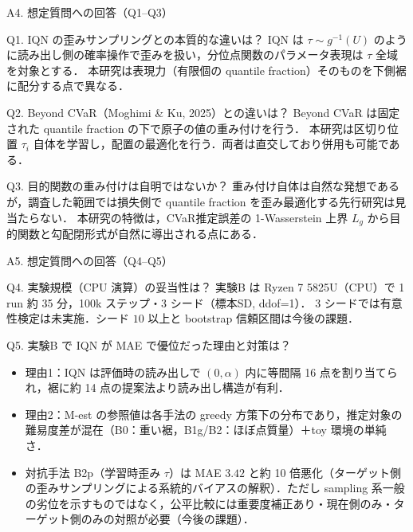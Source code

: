 \documentclass[aspectratio=169, 10pt]{beamer}
\newcommand{\Lg}{L_g}
\begin{document}
\begin{frame}{A4. 想定質問への回答（Q1--Q3）}
  \begin{alertblock}{Q1. IQN の歪みサンプリングとの本質的な違いは？}
    IQN は $\tau\sim g^{-1}(U)$ のように\alert{読み出し側の確率操作}で歪みを扱い，分位点関数のパラメータ表現は $\tau$ 全域を対象とする．
    本研究は\alert{表現力（有限個の quantile fraction）そのものを下側裾に配分}する点で異なる．
  \end{alertblock}
  \begin{alertblock}{Q2. Beyond CVaR（Moghimi \& Ku, 2025）との違いは？}
    Beyond CVaR は\alert{固定}された quantile fraction の下で原子の\alert{値の重み付け}を行う．
    本研究は\alert{区切り位置 $\tau_i$ 自体を学習}し，配置の最適化を行う．両者は直交しており併用も可能である．
  \end{alertblock}
  \begin{alertblock}{Q3. 目的関数の重み付けは自明ではないか？}
    重み付け自体は自然な発想であるが，調査した範囲では\alert{損失側で quantile fraction を歪み最適化する先行研究は見当たらない}．
    本研究の特徴は，CVaR推定誤差の 1-Wasserstein 上界 $\Lg$ から目的関数と勾配閉形式が\alert{自然に導出される}点にある．
  \end{alertblock}
\end{frame}

\begin{frame}{A5. 想定質問への回答（Q4--Q5）}
  \begin{alertblock}{Q4. 実験規模（CPU 演算）の妥当性は？}
    実験B は Ryzen 7 5825U（CPU）で 1 run 約 35 分，100k ステップ・3 シード（標本SD, ddof=1）．
    3 シードでは有意性検定は\alert{未実施}．シード $10$ 以上と bootstrap 信頼区間は今後の課題．
  \end{alertblock}
  \begin{alertblock}{Q5. 実験B で IQN が MAE で優位だった理由と対策は？}
    \scriptsize
    \begin{itemize}
      \item 理由1：IQN は評価時の読み出しで $(0,\alpha)$ 内に\alert{等間隔 16 点}を割り当てられ，裾に約 14 点の提案法より読み出し構造が有利．
      \item 理由2：M-est の参照値は各手法の greedy 方策下の分布であり，\alert{推定対象の難易度差}が混在（B0：重い裾，B1g/B2：ほぼ点質量）＋toy 環境の単純さ．
      \item 対抗手法 B2p（学習時歪み $\tau$）は MAE $3.42$ と約 10 倍悪化（\alert{ターゲット側の歪みサンプリングによる系統的バイアス}の解釈）．ただし sampling 系一般の劣位を示すものではなく，公平比較には\alert{重要度補正あり・現在側のみ・ターゲット側のみ}の対照が必要（今後の課題）．
    \end{itemize}
  \end{alertblock}
\end{frame}
\end{document}
